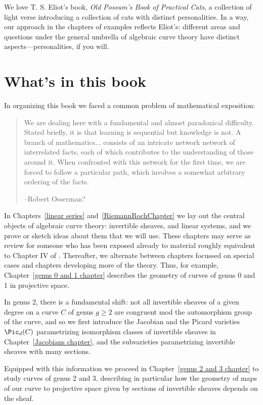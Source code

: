 We love T. S. Eliot's book, \emph{Old Possum's Book of Practical Cats}, a collection of light verse introducing a collection of cats with distinct personalities. In a way, our approach in the chapters of examples reflects Eliot's: different areas and questions under the general umbrella of algebraic curve theory have distinct aspects---personalities, if you will.


\section{What's in this book}
In organizing this book we faced a common problem of  mathematical exposition:
\begin{quote}
\small\sf
We are dealing here with a fundamental and almost paradoxical difficulty. Stated briefly, it is that learning is sequential but knowledge is not. A branch of mathematics... consists of an intricate network network of interrelated facts, each of which contributes to the understanding of those around it. When confronted with this network for the first time, we are forced to follow a particular path, which involves a somewhat arbitrary ordering of the facts.

--Robert Osserman\cite{Poetry}?

\end{quote}

In Chapters~\ref{linear series} and~\ref{RiemannRochChapter} we lay out the central objects of algebraic curve theory: invertible sheaves, and linear systems, and we prove or sketch ideas about them that we will use. These chapters may serve as review for someone who has been exposed already to material roughly equivalent to Chapter IV of \cite{Hartshorne1977}. Thereafter, we alternate between chapters focussed on special cases and chapters developing more of the theory. Thus, for example, Chapter~\ref{genus 0 and 1 chapter} describes the geometry of curves of genus 0 and 1 in projective space. 

In genus 2, there is a fundamental shift: not all invertible sheaves of a given degree on a curve $C$ of genus $g \geq 2$ are congruent mod the automorphism group of the curve, and so we first introduce the Jacobian and the Picard varieties $\Pic_d(C)$ parametrizing isomorphism classes of invertible sheaves in Chapter~\ref{Jacobians chapter}, and the subvarieties parametrizing invertible sheaves with many sections.

Equipped with this information we proceed in Chapter~\ref{genus 2 and 3 chapter} to study curves of genus 2 and 3, describing in particular how the geometry of maps of our curve to projective space given by sections of invertible sheaves depends on the sheaf. 

